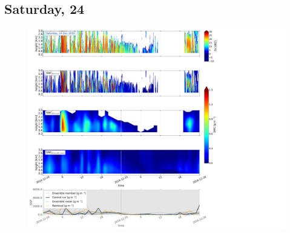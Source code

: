 \subsection{Saturday, \SI{24}{\dec}}
\label{sec:vertEM09:2412}
\begin{figure}[t]
	\centering
	\includegraphics[trim={0.4cm .4cm 31.3cm 63.5cm},clip,width=\textwidth]{./fig_SWC/20161224}
	\caption{}\label{fig:SWP24}
\end{figure}
%
